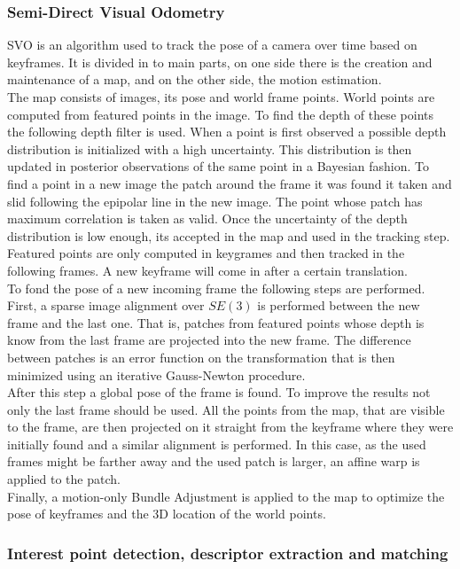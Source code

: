 \subsubsection{Semi-Direct Visual Odometry}
\label{ssub:semi_direct_visual_odometry}

SVO is an algorithm used to track the pose of a camera over time based on keyframes. It is divided in to main parts, on one side there is the creation and maintenance of a map, and on the other side, the motion estimation. \\

The map consists of images, its pose and world frame points. World points are computed from featured points in the image. To find the depth of these points the following depth filter is used. When a point is first observed a possible depth distribution is initialized with a high uncertainty. This distribution is then updated in posterior observations of the same point in a Bayesian fashion. To find a point in a new image the patch around the frame it was found it taken and slid following the epipolar line in the new image. The point whose patch has maximum correlation is taken as valid. Once the uncertainty of the depth distribution is low enough, its accepted in the map and used in the tracking step.\\

Featured points are only computed in keygrames and then tracked in the following frames. A new keyframe will come in after a certain translation.\\

To fond the pose of a new incoming frame the following steps are performed. First, a sparse image alignment over $SE(3)$ is performed between the new frame and the last one. That is, patches from featured points whose depth is know from the last frame are projected into the new frame. The difference between patches is an error function on the transformation that is then minimized using an iterative Gauss-Newton procedure.\\

After this step a global pose of the frame is found. To improve the results not only the last frame should be used. All the points from the map, that are visible to the frame, are then projected on it straight from the keyframe where they were initially found and a similar alignment is performed. In this case, as the used frames might be farther away and the used patch is larger, an affine warp is applied to the patch. \\

Finally, a motion-only Bundle Adjustment is applied to the map to optimize the pose of keyframes and the 3D location of the world points.\\


\subsubsection{Interest point detection, descriptor extraction and matching}
\label{ssub:interest_point_detection_descriptor_extraction_and_matching}







